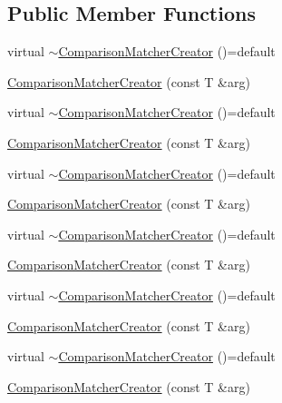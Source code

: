\subsection*{Public Member Functions}
\begin{DoxyCompactItemize}
\item 
virtual \mbox{\hyperlink{structfakeit_1_1ComparisonMatcherCreator_a68be48f2907df6717e3e3fd699150e32}{$\sim$\+Comparison\+Matcher\+Creator}} ()=default
\item 
\mbox{\hyperlink{structfakeit_1_1ComparisonMatcherCreator_ab8a8c71e965e7ab463c63fe514b3ce7a}{Comparison\+Matcher\+Creator}} (const T \&arg)
\item 
virtual \mbox{\hyperlink{structfakeit_1_1ComparisonMatcherCreator_a68be48f2907df6717e3e3fd699150e32}{$\sim$\+Comparison\+Matcher\+Creator}} ()=default
\item 
\mbox{\hyperlink{structfakeit_1_1ComparisonMatcherCreator_ab8a8c71e965e7ab463c63fe514b3ce7a}{Comparison\+Matcher\+Creator}} (const T \&arg)
\item 
virtual \mbox{\hyperlink{structfakeit_1_1ComparisonMatcherCreator_a68be48f2907df6717e3e3fd699150e32}{$\sim$\+Comparison\+Matcher\+Creator}} ()=default
\item 
\mbox{\hyperlink{structfakeit_1_1ComparisonMatcherCreator_ab8a8c71e965e7ab463c63fe514b3ce7a}{Comparison\+Matcher\+Creator}} (const T \&arg)
\item 
virtual \mbox{\hyperlink{structfakeit_1_1ComparisonMatcherCreator_a68be48f2907df6717e3e3fd699150e32}{$\sim$\+Comparison\+Matcher\+Creator}} ()=default
\item 
\mbox{\hyperlink{structfakeit_1_1ComparisonMatcherCreator_ab8a8c71e965e7ab463c63fe514b3ce7a}{Comparison\+Matcher\+Creator}} (const T \&arg)
\item 
virtual \mbox{\hyperlink{structfakeit_1_1ComparisonMatcherCreator_a68be48f2907df6717e3e3fd699150e32}{$\sim$\+Comparison\+Matcher\+Creator}} ()=default
\item 
\mbox{\hyperlink{structfakeit_1_1ComparisonMatcherCreator_ab8a8c71e965e7ab463c63fe514b3ce7a}{Comparison\+Matcher\+Creator}} (const T \&arg)
\item 
virtual \mbox{\hyperlink{structfakeit_1_1ComparisonMatcherCreator_a68be48f2907df6717e3e3fd699150e32}{$\sim$\+Comparison\+Matcher\+Creator}} ()=default
\item 
\mbox{\hyperlink{structfakeit_1_1ComparisonMatcherCreator_ab8a8c71e965e7ab463c63fe514b3ce7a}{Comparison\+Matcher\+Creator}} (const T \&arg)
\item 

\end{DoxyCompactItemize}
